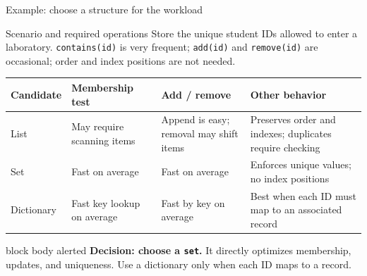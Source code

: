 \documentclass[aspectratio=169]{beamer}
\begin{document}
\begin{frame}{Example: choose a structure for the workload}
  \footnotesize
  \begin{block}{Scenario and required operations}
    Store the unique student IDs allowed to enter a laboratory.
    \texttt{contains(id)} is very frequent; \texttt{add(id)} and
    \texttt{remove(id)} are occasional; order and index positions are not needed.
  \end{block}

  \begin{center}
    \setlength{\tabcolsep}{4pt}
    \renewcommand{\arraystretch}{1.03}
    \begin{tabular}{L{0.13\textwidth}L{0.20\textwidth}L{0.22\textwidth}L{0.34\textwidth}}
      \toprule
      \textbf{Candidate} & \textbf{Membership test} & \textbf{Add / remove} & \textbf{Other behavior} \\
      \midrule
      List & May require scanning items & Append is easy; removal may shift items &
        Preserves order and indexes; duplicates require checking \\
      Set & Fast on average & Fast on average &
        Enforces unique values; no index positions \\
      Dictionary & Fast key lookup on average & Fast by key on average &
        Best when each ID must map to an associated record \\
      \bottomrule
    \end{tabular}
  \end{center}

  \vspace{0.25em}
  \begin{beamercolorbox}[wd=\textwidth,sep=0.55em,rounded=true]{block body alerted}
    \textbf{Decision: choose a \texttt{set}.} It directly optimizes membership,
    updates, and uniqueness. Use a dictionary only when each ID maps to a record.
  \end{beamercolorbox}
\end{frame}
\end{document}
